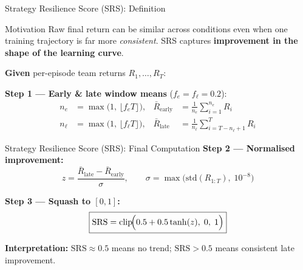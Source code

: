 \documentclass[10pt,aspectratio=169]{beamer}
\newcommand{\SRS}{\mathrm{SRS}}
\newcommand{\E}[1]{\bar{R}_{\mathrm{#1}}}
\begin{document}
\begin{frame}{Strategy Resilience Score (SRS): Definition}
  \small
  \begin{block}{Motivation}
    Raw final return can be similar across conditions even when one
    training trajectory is far more \emph{consistent}.
    SRS captures \textbf{improvement in the shape of the learning curve}.
  \end{block}

  \medskip
  \textbf{Given} per-episode team returns $R_1, \ldots, R_T$:

  \medskip
  \textbf{Step 1 --- Early \& late window means} ($f_e = f_\ell = 0.2$):
  \begin{align}
    n_e &= \max\!\bigl(1,\,\lfloor f_e T\rfloor\bigr), &
    \E{early} &= \frac{1}{n_e}\sum_{i=1}^{n_e} R_i \\[4pt]
    n_\ell &= \max\!\bigl(1,\,\lfloor f_\ell T\rfloor\bigr), &
    \E{late}  &= \frac{1}{n_\ell}\sum_{i=T-n_\ell+1}^{T} R_i
  \end{align}

\end{frame}

\begin{frame}{Strategy Resilience Score (SRS): Final Computation}
  \small
  \textbf{Step 2 --- Normalised improvement:}
  \[
    z = \frac{\E{late} - \E{early}}{\sigma}, \qquad
    \sigma = \max\!\bigl(\mathrm{std}(R_{1:T}),\;10^{-8}\bigr)
  \]

  \smallskip
  \textbf{Step 3 --- Squash to $[0,1]$:}
  \[
  \boxed{\SRS = \mathrm{clip}\!\Bigl(0.5 + 0.5\tanh(z),\;0,\;1\Bigr)}
  \]

  \smallskip
  \textbf{Interpretation:}
  $\SRS \approx 0.5$ means no trend; $\SRS > 0.5$ means consistent late improvement.
\end{frame}
\end{document}
